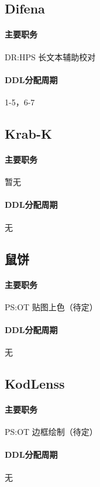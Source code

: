 \documentclass[UTF8, a4paper, 12pt]{ctexart}
\begin{document}
\newpage
\subsection{Difena}\label{difena}
\paragraph{主要职务} DR:HPS 长文本辅助校对
\paragraph{DDL分配周期} 1-5，6-7

\newpage

\subsection{Krab-K}\label{k}
\paragraph{主要职务} 暂无
\paragraph{DDL分配周期} 无

\newpage
\subsection{鼠饼}\label{shubing}
\paragraph{主要职务} PS:OT 贴图上色（待定）
\paragraph{DDL分配周期} 无

\newpage
\subsection{KodLenss}\label{kodlenss}
\paragraph{主要职务} PS:OT 边框绘制（待定）
\paragraph{DDL分配周期} 无
\end{document}
